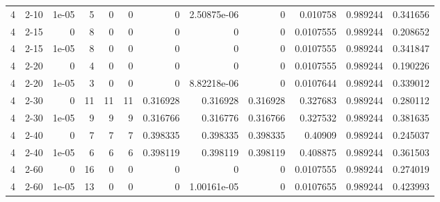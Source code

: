 \begin{tabular}{rlrrrrrrrrrr}
     4 & 2-10   &      1e-05 &           5 &                 0 &                 0 &     0           &     2.50875e-06 &      0           &        0.010758  &               0.989244 &           0.341656 \\
     4 & 2-15   &      0     &           8 &                 0 &                 0 &     0           &     0           &      0           &        0.0107555 &               0.989244 &           0.208652 \\
     4 & 2-15   &      1e-05 &           8 &                 0 &                 0 &     0           &     0           &      0           &        0.0107555 &               0.989244 &           0.341847 \\
     4 & 2-20   &      0     &           4 &                 0 &                 0 &     0           &     0           &      0           &        0.0107555 &               0.989244 &           0.190226 \\
     4 & 2-20   &      1e-05 &           3 &                 0 &                 0 &     0           &     8.82218e-06 &      0           &        0.0107644 &               0.989244 &           0.339012 \\
     4 & 2-30   &      0     &          11 &                11 &                11 &     0.316928    &     0.316928    &      0.316928    &        0.327683  &               0.989244 &           0.280112 \\
     4 & 2-30   &      1e-05 &           9 &                 9 &                 9 &     0.316766    &     0.316776    &      0.316766    &        0.327532  &               0.989244 &           0.381635 \\
     4 & 2-40   &      0     &           7 &                 7 &                 7 &     0.398335    &     0.398335    &      0.398335    &        0.40909   &               0.989244 &           0.245037 \\
     4 & 2-40   &      1e-05 &           6 &                 6 &                 6 &     0.398119    &     0.398119    &      0.398119    &        0.408875  &               0.989244 &           0.361503 \\
     4 & 2-60   &      0     &          16 &                 0 &                 0 &     0           &     0           &      0           &        0.0107555 &               0.989244 &           0.274019 \\
     4 & 2-60   &      1e-05 &          13 &                 0 &                 0 &     0           &     1.00161e-05 &      0           &        0.0107655 &               0.989244 &           0.423993 \\

\end{tabular}
